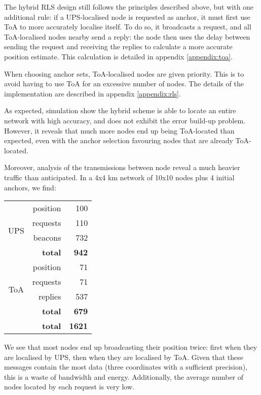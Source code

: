 \documentclass[12pt,a4paper,fleqn]{report}
\begin{document}
The hybrid RLS design still follows the principles described above, but with one additional rule: if a UPS-localised node is requested as anchor, it must first use ToA to more accurately localise itself. To do so, it broadcasts a request, and all ToA-localised nodes nearby send a reply: the node then uses the delay between sending the request and receiving the replies to calculate a more accurate position estimate. This calculation is detailed in appendix \ref{appendix:toa}.

When choosing anchor sets, ToA-localised nodes are given priority. This is to avoid having to use ToA for an excessive number of nodes. The details of the implementation are described in appendix \ref{appendix:rls}.

As expected, simulation show the hybrid scheme is able to locate an entire network with high accuracy, and does not exhibit the error build-up problem. However, it reveals that much more nodes end up being ToA-located than expected, even with the anchor selection favouring nodes that are already ToA-located.

Moreover, analysis of the transmissions between node reveal a much heavier traffic than anticipated. In a 4x4 km network of 10x10 nodes plus 4 initial anchors, we find:

\begin{table}[H]
\centering
\begin{tabular}{|c|r|r|}
	\hline
	\multirow{4}{*}{UPS}
	& position			& 100	\\
	& requests			& 110	\\
	& beacons			& 732	\\
	& \textbf{total}	& \textbf{942}	\\
	\hline
	\multirow{4}{*}{ToA}
	& position			& 71	\\
	& requests			& 71	\\
	& replies			& 537	\\
	& \textbf{total}	& \textbf{679}	\\
	\hline
	\multicolumn{2}{|r|}{\textbf{total}}
						& \textbf{1621}	\\
	\hline
\end{tabular}
\end{table}

We see that most nodes end up broadcasting their position twice: first when they are localised by UPS, then when they are localised by ToA. Given that these messages contain the most data (three coordinates with a sufficient precision), this is a waste of bandwidth and energy. Additionally, the average number of nodes located by each request is very low.
\end{document}
